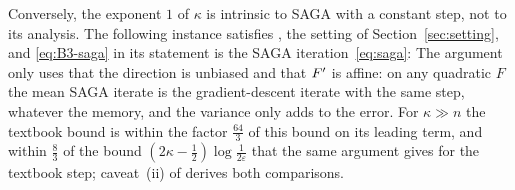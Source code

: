 Conversely, the exponent $1$ of $\kappa$ is intrinsic to SAGA with a constant step, not to its analysis. The following
instance satisfies , the setting of Section~\ref{sec:setting}, and \eqref{eq:B3-saga} in its
statement is the SAGA iteration~\eqref{eq:saga}:
The argument only uses that the direction is unbiased and that $F'$ is affine: on any quadratic $F$ the mean SAGA
iterate is the gradient-descent iterate with the same step, whatever the memory, and the variance only adds to the
error. For $\kappa\gg n$ the textbook bound is within the factor $\frac{64}3$ of this bound on its leading term, and within
$\frac83$ of the bound $(2\kappa-\frac12)\log\frac1{2\varepsilon}$ that the same argument gives for the textbook step;
caveat~(ii) of  derives both comparisons.


